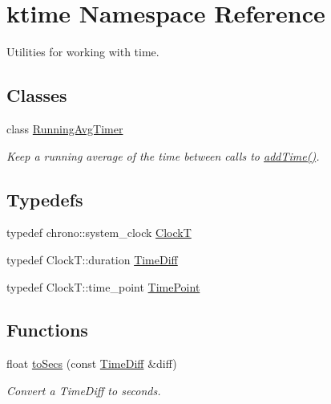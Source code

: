\hypertarget{namespacektime}{\section{ktime Namespace Reference}
\label{namespacektime}
}


Utilities for working with time.  


\subsection*{Classes}
\begin{DoxyCompactItemize}
\item 
class \hyperlink{classktime_1_1_running_avg_timer}{Running\-Avg\-Timer}
\begin{DoxyCompactList}\small\item\em Keep a running average of the time between calls to {\ttfamily \hyperlink{classktime_1_1_running_avg_timer_a1b28c95f0c44346321af8738e35f8025}{add\-Time()}}. \end{DoxyCompactList}\end{DoxyCompactItemize}
\subsection*{Typedefs}
\begin{DoxyCompactItemize}
\item 
typedef chrono\-::system\-\_\-clock \hyperlink{namespacektime_ac6b33ea027bdc032e7ba377509c8e51f}{Clock\-T}
\item 
typedef Clock\-T\-::duration \hyperlink{namespacektime_aacefffdcc0ccc2f45598475b3557d6f2}{Time\-Diff}
\item 
typedef Clock\-T\-::time\-\_\-point \hyperlink{namespacektime_a038a3d1fb2cb9885396233d6e412773e}{Time\-Point}
\end{DoxyCompactItemize}
\subsection*{Functions}
\begin{DoxyCompactItemize}
\item 
float \hyperlink{namespacektime_a89b89374ae2f385f58b64c5a2438a718}{to\-Secs} (const \hyperlink{namespacektime_aacefffdcc0ccc2f45598475b3557d6f2}{Time\-Diff} \&diff)
\begin{DoxyCompactList}\small\item\em Convert a Time\-Diff to seconds. \end{DoxyCompactList}\end{DoxyCompactItemize}


